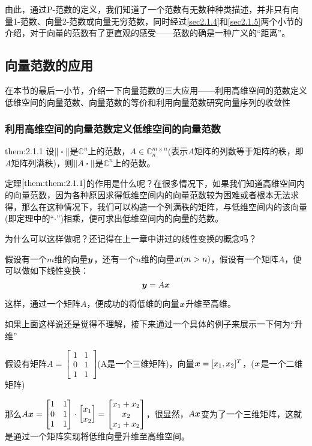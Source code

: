 \documentclass[12pt, a4paper, oneside, UTF8]{ctexbook}
\begin{document}
由此，通过P-范数的定义，我们知道了一个范数有无数种种类描述，并非只有向量1-范数、向量2-范数或向量无穷范数，同时经过\ref{sec2.1.4}和\ref{sec2.1.5}两个小节的介绍，对于向量的范数有了更直观的感受——范数的确是一种广义的“距离”。


\subsection{向量范数的应用}
在本节的最后一小节，介绍一下向量范数的三大应用——利用高维空间的范数定义低维空间的向量范数、向量范数的等价和利用向量范数研究向量序列的收敛性
\subsubsection{利用高维空间的向量范数定义低维空间的向量范数}
\begin{them}{}{them:2.1.1}
    设$\Vert\boldsymbol{\cdot}\Vert$是$\mathbb{C}^n$上的范数，$A\in\mathbb{C}_{n}^{m\times n}$(表示$A$矩阵的列数等于矩阵的秩，即$A$矩阵列满秩)，则$\Vert A\boldsymbol{\cdot}\Vert$是$\mathbb{C}^n$上的范数。
\end{them}
定理$\ref{them:them:2.1.1}$的作用是什么呢？在很多情况下，如果我们知道高维空间内的向量范数，因为各种原因求得低维空间内的向量范数较为困难或者根本无法求得，那么在这种情况下，我们可以构造一个列满秩的矩阵，与低维空间内的该向量(即定理中的“$\cdot$”)相乘，便可求出低维空间内的向量的范数。

为什么可以这样做呢？还记得在上一章中讲过的线性变换的概念吗？

假设有一个$m$维的向量$\boldsymbol{y}$，还有一个$n$维的向量$\boldsymbol{x}(m>n)$，假设有一个矩阵$A$，便可以做如下线性变换：
\[\boldsymbol{y}=A\boldsymbol{x}\]

这样，通过一个矩阵$A$，便成功的将低维的向量$\boldsymbol{x}$升维至高维。

如果上面这样说还是觉得不理解，接下来通过一个具体的例子来展示一下何为“升维”

\begin{example}
    假设有矩阵$A=\begin{bmatrix}
        1&1\\
        0&1\\
        1&1
    \end{bmatrix}$(A是一个三维矩阵)，向量$\boldsymbol{x}=[x_1,x_2]^{T}$，($\boldsymbol{x}$是一个二维矩阵)

    那么$A\boldsymbol{x}=\begin{bmatrix}
        1&1\\
        0&1\\
        1&1
    \end{bmatrix}\cdot\begin{bmatrix}
        x_1\\
        x_2
    \end{bmatrix}=\begin{bmatrix}
        x_1+x_2\\
        x_2\\
        x_1+x_2
    \end{bmatrix}$，很显然，$A\boldsymbol{x}$变为了一个三维矩阵，这就是通过一个矩阵实现将低维向量升维至高维空间。
\end{example}
\end{document}
